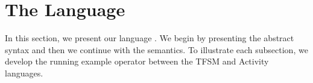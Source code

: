 \section{The Language}
In this section, we present our language \bcool. We begin by presenting the abstract syntax and then we continue with the semantics. To illustrate each subsection, we develop the running example operator between the TFSM and Activity languages.





